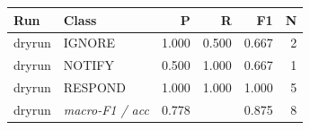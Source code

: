 \begin{tabular}{llrrrr}
\toprule
Run & Class & P & R & F1 & N \\
\midrule
dryrun & IGNORE & 1.000 & 0.500 & 0.667 & 2 \\
dryrun & NOTIFY & 0.500 & 1.000 & 0.667 & 1 \\
dryrun & RESPOND & 1.000 & 1.000 & 1.000 & 5 \\
dryrun & \textit{macro-F1 / acc} & 0.778 &  & 0.875 & 8 \\
\bottomrule
\end{tabular}

